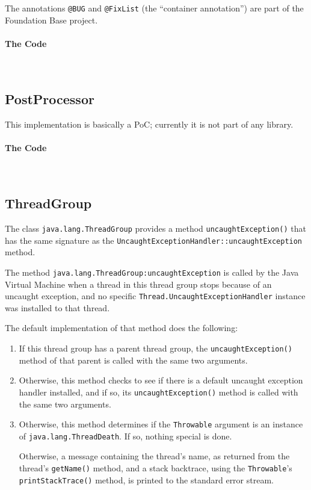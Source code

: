 \documentclass[11pt,a4paper, titlepage, parskip=half, headsepline, footsepline, cleardoublepage=current, headheight=1cm]{scrbook}
\begin{document}
The annotations \lstinline|@BUG| and \lstinline|@FixList| (the “container annotation”) are part of the Foundation Base project\autocite{TQUADRAT_ORG_FOUNDATION_BASE, TQUADRAT_ORG_FOUNDATION_BUG, TQUADRAT_ORG_FOUNDATION_FIXLIST}.

\paragraph{The Code} \




\subsection{PostProcessor}\label{sec:PostProcessor}
This implementation is basically a PoC; currently it is not part of any library.

\paragraph{The Code} \


\subsection{ThreadGroup}\label{sec:ThreadGroup}
The class \lstinline|java.lang.ThreadGroup|\autocite{ORACLE_DOC_THREADGROUP_CLASS} provides a method \lstinline|uncaughtException()| that has the same signature as the \lstinline|UncaughtExceptionHandler::uncaughtException|\autocite{ORACLE_DOC_UNCAUGHTEXCEPTIONHANDLER:uncaughtException} method.

The method \lstinline|java.lang.ThreadGroup:uncaughtException| is called by the Java Virtual Machine when a thread in this thread group stops because of an uncaught exception, and no specific \lstinline|Thread.UncaughtExceptionHandler|\autocite{ORACLE_DOC_UNCAUGHTEXCEPTIONHANDLER_INTERFACE} instance was installed
to that thread.

The default implementation of that method does the following:
\begin{enumerate}
\item{If this thread group has a parent thread group, the \lstinline|uncaughtException()| method of that parent is called with the same two arguments.}
\item{Otherwise, this method checks to see if there is a default uncaught exception handler installed, and if so, its \lstinline|uncaughtException()| method is called with the same two arguments.}
\item{Otherwise, this method determines if the \lstinline|Throwable| argument is an instance of \lstinline|java.lang.ThreadDeath|. If so, nothing special is done.

Otherwise, a message containing the thread's name, as returned from the thread's \lstinline|getName()| method, and a stack backtrace, using the \lstinline|Throwable|'s \lstinline|printStackTrace()| method, is printed to the standard error stream.}
\end{enumerate}
\end{document}
